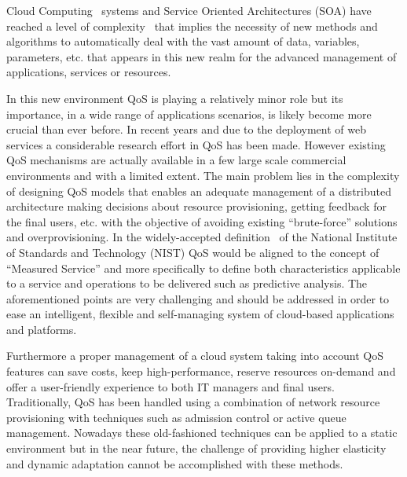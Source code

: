 Cloud Computing~\cite{mell2011nist} systems and Service Oriented Architectures (SOA) have 
reached a level of complexity~\cite{Huebscher:2008:SAC:1380584.1380585,Conejero:2012:MSQ:2357487.2357591} that implies the necessity of new methods 
and algorithms to automatically deal with the vast amount of data, variables, 
parameters, etc. that appears in this new realm for the advanced management of 
applications, services or resources. 

In this new environment QoS is playing a relatively minor role but its 
importance, in a wide range of applications scenarios, is likely become more 
crucial than ever before. In recent years and due to the deployment of web 
services a considerable research effort in QoS has been made. However existing 
QoS mechanisms are actually available in a few large scale commercial 
environments and with a limited extent. The main problem lies in the complexity 
of designing QoS models that enables an adequate management of a distributed 
architecture making decisions about resource provisioning, getting feedback for 
the final users, etc. with the objective of avoiding existing ``brute-force''
solutions and overprovisioning. In the widely-accepted definition~\cite{mell2011nist} of 
the National Institute of Standards and Technology (NIST) QoS would be aligned to the concept 
of ``Measured Service'' and more specifically to define both characteristics applicable to a service and operations 
to be delivered such as predictive analysis. The aforementioned points are very 
challenging and should be addressed in order to ease an intelligent, 
flexible and self-managing system of cloud-based applications and platforms.

Furthermore a proper management of a cloud system taking into account QoS 
features can save costs, keep high-performance, reserve resources on-demand and 
offer a user-friendly experience to both IT managers and final users. 
Traditionally, QoS has been handled using a combination of network resource 
provisioning with techniques such as admission control or active queue 
management. Nowadays these old-fashioned techniques can be applied to a static 
environment but in the near future, the challenge of providing higher elasticity and 
dynamic adaptation cannot be accomplished with these methods. 

